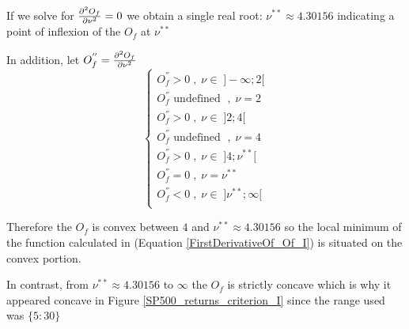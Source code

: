 If we solve for $\pdv[2]{O_f}{\nu} = 0$ we obtain a single real root: $\nu^{**} \approx 4.30156$ indicating a point of inflexion of the $O_f$ at $\nu^{**}$ 
\smallskip \par
In addition, let $O_f^{''}=\pdv[2]{O_f}{\nu}$
\begin{equation*}
    \begin{cases}
        O_f^{''} > 0 \; , \; \nu \in \; ]-\infty;2[ \\
        O_f^{''} \text{ undefined } \; , \; \nu = 2 \\
        O_f^{''} > 0 \; , \; \nu \in \; ]2;4[ \\
        O_f^{''} \text{ undefined } \; , \; \nu = 4 \\
        O_f^{''} > 0 \; , \; \nu \in \; ]4;\nu^{**}[ \\
        O_f^{''} = 0 \; , \; \nu = \nu^{**} \\
        O_f^{''} < 0 \; , \; \nu \in \; ]\nu^{**};\infty[ \\
    \end{cases}
\end{equation*}

Therefore the $O_f$ is convex between $4$ and $\nu^{**} \approx 4.30156$ so the local minimum of the function calculated in (Equation \ref{FirstDerivativeOf_Of_I}) is situated on the convex portion.
\smallskip\par
In contrast, from $\nu^{**} \approx 4.30156$ to $\infty$ the $O_f$ is strictly concave which is why it appeared concave in Figure \ref{SP500_returns_criterion_I} since the range used was $\{5:30\}$

